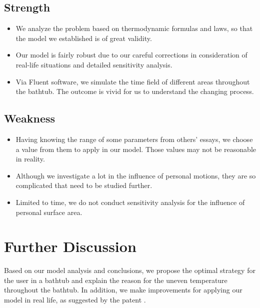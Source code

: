 \documentclass{mcmthesis}
\begin{document}
\subsection{Strength}

\begin{itemize}
    \item We analyze the problem based on thermodynamic formulas and laws, so that
          the model we established is of great validity.

    \item Our model is fairly robust due to our careful corrections in consideration
          of real-life situations and detailed sensitivity analysis.

    \item Via Fluent software, we simulate the time field of different areas
          throughout the bathtub. The outcome is vivid for us to understand the changing
          process.

\end{itemize}

\subsection{Weakness}

\begin{itemize}
    \item Having knowing the range of some parameters from others’ essays, we choose
          a value from them to apply in our model. Those values may not be reasonable in
          reality.

    \item Although we investigate a lot in the influence of personal motions, they
          are so complicated that need to be studied further.

    \item Limited to time, we do not conduct sensitivity analysis for the influence
          of personal surface area.
\end{itemize}

\section{Further Discussion}

Based on our model analysis and conclusions, we propose the optimal strategy
for the user in a bathtub and explain the reason for the uneven temperature
throughout the bathtub. In addition, we make improvements for applying our
model in real life, as suggested by the patent \textcite{patent2023}.
\end{document}
